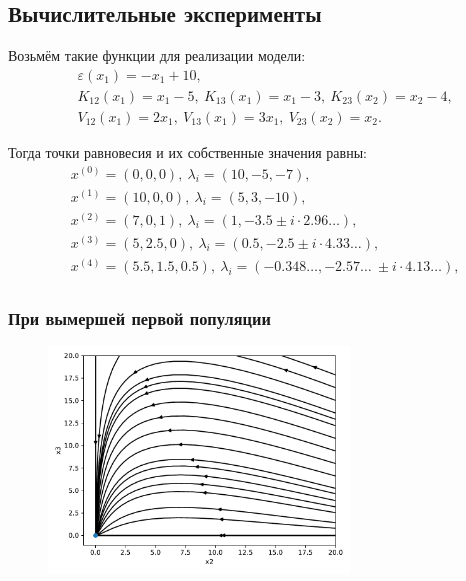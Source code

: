 \subsection{Вычислительные эксперименты}
    Возьмём такие функции для реализации модели:
    \[
        \begin{split}
            & \varepsilon (x_1) = -x_1 + 10, \\
            & K_{12} (x_1) = x_1 - 5, ~ K_{13} (x_1) = x_1 - 3, ~ K_{23} (x_2) = x_2 - 4, \\
            & V_{12} (x_1) = 2 x_1, ~ V_{13} (x_1) = 3 x_1, ~ V_{23} (x_2) = x_2.
        \end{split}
    \]

    Тогда точки равновесия и их собственные значения равны:
    \[
        \begin{split}
            & x^{(0)} = (0,0,0), ~ \lambda_i = (10, -5, -7), \\
            & x^{(1)} = (10,0,0), ~ \lambda_i = (5, 3, -10), \\
            & x^{(2)} = (7,0,1), ~ \lambda_i = (1, -3.5 \pm i \cdot 2.96\dots), \\
            & x^{(3)} = (5,2.5,0 ), ~ \lambda_i = (0.5, -2.5 \pm i \cdot 4.33\dots), \\
            & x^{(4)} = (5.5,1.5,0.5), ~ \lambda_i = (-0.348\dots, -2.57\dots ~ \pm i \cdot 4.13\dots), \\
        \end{split}
    \]

    \subsubsection{При вымершей первой популяции}

    \begin{figure}[H]
        \centering
        \includegraphics[width=8cm]{pictures/kx1_0vector.pdf}
        \caption{} \label{kx1_0}
    \end{figure}

